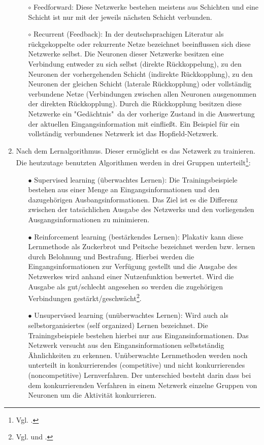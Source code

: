 \begin{enumerate}
\begin{itemize}
\item[$\circ$]%
Feedforward: Diese Netzwerke bestehen meistens aus Schichten und eine Schicht ist nur mit der jeweils nächsten Schicht verbunden.

\item[$\circ$]%
Recurrent (Feedback): In der deutschsprachigen Literatur als rückgekoppelte oder rekurrente Netze bezeichnet beeinflussen sich diese Netzwerke selbst. Die Neuronen dieser Netzwerke besitzen eine Verbindung entweder zu sich selbst (direkte Rückkoppelung), zu den Neuronen der vorhergehenden Schicht (indirekte Rückkopplung), zu den Neuronen der gleichen Schicht (laterale Rückkopplung) oder vollständig verbundene Netze (Verbindungen zwischen allen Neuronen ausgenommen der direkten Rückkopplung). Durch die Rückkopplung besitzen diese Netzwerke ein "Gedächtnis"~da der vorherige Zustand in die Auswertung der aktuellen Eingangsinformation mit einfließt. Ein Beispiel für ein vollständig verbundenes Netzwerk ist das Hopfield-Netzwerk.

\end{itemize}

\item%
Nach dem Lernalgorithmus. Dieser ermöglicht es das Netzwerk zu trainieren. Die heutzutage benutzten Algorithmen werden in drei Gruppen unterteilt\footnote{Vgl. \citet[55]{dkriesel07}.\label{kriesel55}}:

\begin{itemize}
\item[\textbf{$\bullet$}]%
Supervised learning (überwachtes Lernen): Die Trainingsbeispiele bestehen aus einer Menge an Eingangsinformationen und den dazugehörigen Ausbangsinformationen. Das Ziel ist es die Differenz zwischen der tatsächlichen Ausgabe des Netzwerks und den vorliegenden Ausgangsinformationen zu minimieren.

\item[\textbf{$\bullet$}]%
Reinforcement learning (bestärkendes Lernen): Plakativ kann diese Lernmethode als Zuckerbrot und Peitsche bezeichnet werden bzw. lernen durch Belohnung und Bestrafung. Hierbei werden die Eingangsinformationen zur Verfügung gestellt und die Ausgabe des Netzwerkes wird anhand einer Nutzenfunktion bewertet. Wird die Ausgabe als gut/schlecht angesehen so werden die zugehörigen Verbindungen gestärkt/geschwächt\footnote{Vgl. \citet[201]{dkriesel07} und \citet[A2.3:5]{Fiesler96}.}. 

\item[\textbf{$\bullet$}]%
Unsupervised learning (unüberwachtes Lernen): Wird auch als selbstorganisiertes (self organized) Lernen bezeichnet. Die Trainingsbeispiele bestehen hierbei nur aus Eingansinformationen. Das Netzwerk versucht aus den Eingansinformationen selbstständig Ähnlichkeiten zu erkennen.
Unüberwachte Lernmethoden werden noch unterteilt in konkurrierendes (competitive) und nicht konkurrierendes (noncompetitive) Lernverfahren. Der unterschied besteht darin dass bei dem konkurrierenden Verfahren in einem Netzwerk einzelne Gruppen von Neuronen um die Aktivität konkurrieren.


\end{itemize}
\end{enumerate}
